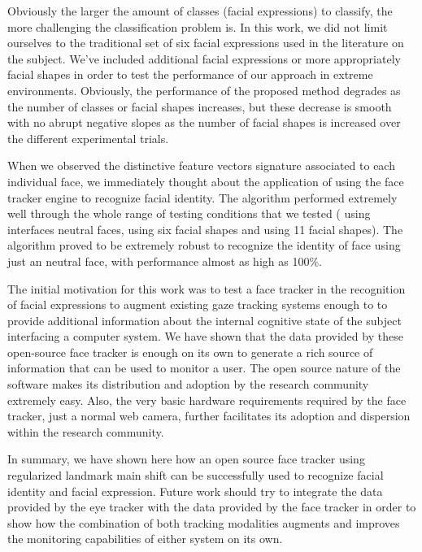 \documentclass[]{article}
\begin{document}
Obviously the larger the amount of classes (facial expressions) to classify, the more challenging the
classification problem is. In this work, we did not limit ourselves to the traditional set  of six facial expressions
used in the literature on the subject. We've included additional facial expressions or more appropriately facial shapes
in order to test the performance of our approach in extreme environments. Obviously, the performance of the proposed
method degrades as the number of classes  or facial shapes increases, but these decrease is smooth with no abrupt
negative slopes as the number of facial shapes is increased over the different experimental trials.


When we observed the distinctive feature vectors signature associated to each individual face, we immediately thought
about the application of using the face tracker engine to recognize facial identity. The algorithm performed extremely
well  through the whole range of testing conditions that we tested ( using interfaces neutral faces, using six facial
shapes and using 11 facial shapes). The algorithm proved to be extremely robust to recognize the identity of face using
just an neutral face, with performance  almost as high as 100\%.

The initial motivation for this work was to test a face tracker in the recognition of facial expressions  to augment
existing gaze tracking systems enough to to provide additional information about the internal cognitive state of the
subject interfacing a computer system. We have shown that the data provided by these open-source face tracker is enough
on its own to generate a rich source of information that can be used to monitor a user. The open source nature of the
software makes its distribution and adoption by the research community extremely easy. Also, the very basic hardware
requirements required by the face tracker, just a normal web camera, further facilitates its adoption and dispersion
within the research community. 


In summary, we have shown here how an open source face tracker using regularized landmark main shift can be successfully
used to recognize facial identity and facial expression. Future work should try to integrate the data provided by the
eye tracker with the data provided by the face tracker in order to show how the combination of both tracking modalities
augments and improves the monitoring capabilities of either system on its own.





\end{document}
